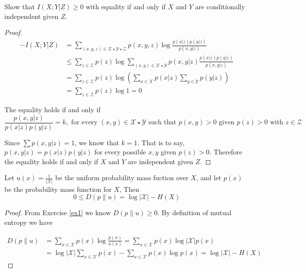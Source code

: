 \begin{exercise} {Show that $I(X;Y|Z)\ge 0$ with equality if and only if $X$ and $Y$ are conditionally independent given $Z$.}
\begin{proof}
\begin{equation}
  \begin{aligned}
    -I(X;Y|Z) &= \sum_{(x,y,z)\in \mathcal{X}\star \mathcal{Y} \star \mathcal{Z}} p(x,y,z) \log {\frac{p(x|z)p(y|z)}{p(x,y|z)}} \\
    &\le \sum_{z\in \mathcal{Z}} p(z) \log \sum_{(x,y)\in \mathcal{X} \star \mathcal{Y} } p(x,y|z) \frac{p(x|z)p(y|z)}{p(x,y|z)} \\
    &= \sum_{z\in \mathcal{Z}} p(z)  \log \left(\sum_{x\in \mathcal{X}}p(x|z) \sum_{y \in \mathcal{Y}} p(y|z) \right) \\
    &= \sum_{z\in \mathcal{Z}} p(z) \log 1 = 0
  \end{aligned}
\end{equation}

The equality holds if and only if $$\frac{p(x,y|z)}{p(x|z)p(y|z)}=k, \text{ for every } (x,y) \in \mathcal{X} \star \mathcal{Y} \text{ such that } p(x,y)>0 \text{ given } p(z)>0 \text{ with } z\in \mathcal{Z}$$

Since $\sum p(x,y|z) = 1$, we know that $k=1$. That is to say, $p(x,y|z) = p(x|z)p(y|z)$ for every possible $x,y$ given $p(z)>0$. Therefore the equality holds if and only if $X$ and $Y$ are independent given $Z$.

\end{proof}
\end{exercise}


\begin{exercise} {Let $u(x)=\frac{1}{|\mathcal{X}|}$ be the uniform probability mass fuction over $X$, and let $p(x)$ be the probability mass function for $X$, Then
  $$0\le D(p\| u)= \log |\mathcal{X}|-H(X)$$}
\begin{proof}
  
  From Exercise \ref{ex1} we know $D(p\| u)\ge 0$. By definition of mutual entropy we have

  \begin{equation}
    \begin{aligned}
      D(p\| u) &= \sum_{x\in \mathcal{X}}p(x) \log{\frac{p(x)}{u(x)}} = \sum_{x\in \mathcal{X}}p(x) \log{|\mathcal{X}|p(x)} \\
      &= \log{|\mathcal{X}|}\sum_{x\in \mathcal{X}}p(x) - \sum_{x\in \mathcal{X}} p(x) \log p(x) =  \log |\mathcal{X}|-H(X)
    \end{aligned}
  \end{equation}
\end{proof}
\end{exercise}

